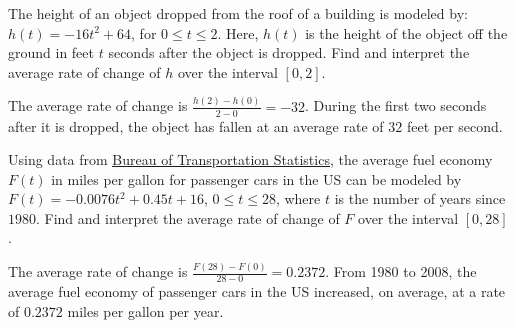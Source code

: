\documentclass{ximera}
\begin{document}
\begin{problem}
The height of an object dropped from the roof of a building is modeled by:  $h(t) = -16t^2 + 64$, for $0 \leq t \leq 2$. Here,  $h(t)$ is the height of the object off the ground in feet $t$ seconds after the object is dropped.  Find and interpret the average rate of change of $h$ over the interval $[0,2]$.

\begin{solution}
The average rate of change is $\frac{h(2) - h(0)}{2-0}=-32$.  During the first two seconds after it is dropped, the object has fallen at an average rate of $32$ feet per second.
\end{solution}
\end{problem}

\begin{problem}
Using data from \href{http://www.bts.gov/publications/national_transportation_statistics/html/table_04_23.html}{\underline{Bureau of Transportation Statistics}}, the average fuel economy $F(t)$ in miles per gallon for passenger cars in the US can be modeled by  $F(t) = -0.0076t^2+0.45t + 16$, $0 \leq t \leq 28$, where $t$ is the number of years since $1980$. Find and interpret the average rate of change of $F$ over the interval $[0,28]$.

\begin{solution}
The average rate of change is $\frac{F(28) - F(0)}{28-0}=0.2372$.  From 1980 to 2008, the average fuel economy of passenger cars in the US increased, on average, at a rate of $0.2372$ miles per gallon per year.
\end{solution}
\end{problem}
\end{document}
